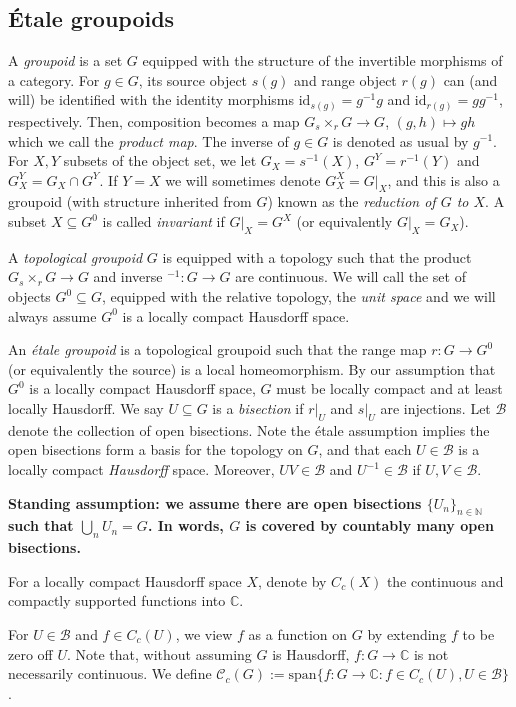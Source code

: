 \documentclass[a4paper, 12pt]{amsart}
\theoremstyle{definition}
\theoremstyle{remark}
\numberwithin{equation}{section}
\begin{document}
\subsection{\'Etale groupoids}
A \emph{groupoid} is a set $G$ equipped with the structure of the invertible morphisms of a category. For $g\in G$, its source object $s(g)$ and range object $r(g)$ can (and will) be identified with the identity morphisms $\text{id}_{s(g)} = g^{-1}g$ and $\text{id}_{r(g)} = gg^{-1}$, respectively. Then, composition becomes a map $G{}_{s}\times_{r}G\to G$, $(g,h)\mapsto gh$ which we call the \emph{product map}. The inverse of $g\in G$ is denoted as usual by $g^{-1}$. For $X, Y$ subsets of the object set, we let $G_{X} = s^{-1}(X)$, $G^{Y} = r^{-1}(Y)$ and $G^{Y}_{X} = G_{X}\cap G^{Y}$. If $Y =X$ we will sometimes denote $G^{X}_{X} = G|_{X}$, and this is also a groupoid (with structure inherited from $G$) known as the \emph{reduction of $G$ to $X$}. A subset $X\subseteq G^{0}$ is called \emph{invariant} if $G|_{X} = G^{X}$ (or equivalently $ G|_{X} = G_{X}$).

A \emph{topological groupoid} $G$ is equipped with a topology such that the product $G{}_{s}\times_{r}G\to G$ and inverse $^{-1}:G\to G$ are continuous. We will call the set of objects $G^{0}\subseteq G$, equipped with the relative topology, the \emph{unit space} and we will always assume $G^{0}$ is a locally compact Hausdorff space.

An \emph{\'etale groupoid} is a topological groupoid such that the range map $r:G\to G^{0}$ (or equivalently the source) is a local homeomorphism. By our assumption that $G^{0}$ is a locally compact Hausdorff space, $G$ must be locally compact and at least locally Hausdorff. We say $U\subseteq G$ is a \emph{bisection} if $r|_{U}$ and $s|_{U}$ are injections. Let $\mathcal{B}$ denote the collection of open bisections. Note the \'etale assumption implies the open bisections form a basis for the topology on $G$, and that each $U\in\mathcal{B}$ is a locally compact \emph{Hausdorff} space. Moreover, $UV\in\mathcal{B}$ and $U^{-1}\in \mathcal{B}$ if $U,V\in\mathcal{B}$.

\textbf{Standing assumption: we assume there are open bisections $\{U_{n}\}_{n\in\mathbb{N}}$ such that $\bigcup_{n}U_{n} = G$. In words, $G$ is covered by countably many open bisections.}

For a locally compact Hausdorff space $X$, denote by $C_{c}(X)$ the continuous and compactly supported functions into $\mathbb{C}$.

For $U\in\mathcal{B}$ and $f\in C_{c}(U)$, we view $f$ as a function on $G$ by extending $f$ to be zero off $U$. Note that, without assuming $G$ is Hausdorff, $f:G\to \mathbb{C}$ is not necessarily continuous. We define $\mathscr{C}_{c}(G) := \text{span}\{f:G\to \mathbb{C}: f\in C_{c}(U), U\in\mathcal{B}\}$. 
\end{document}
